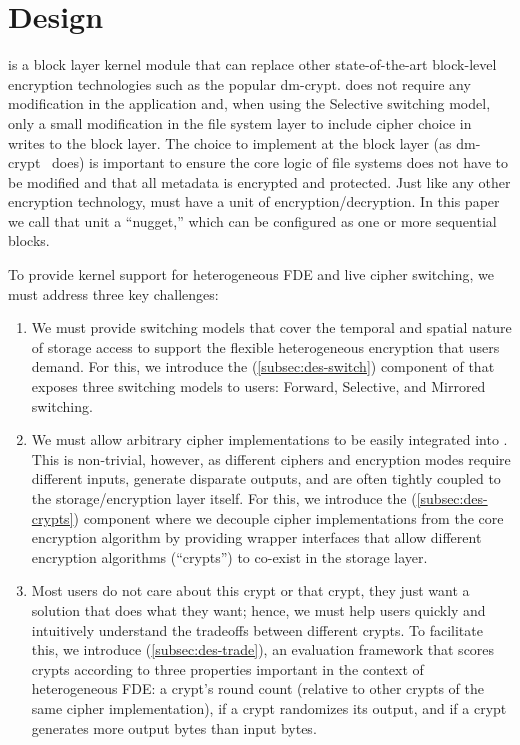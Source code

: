 \section{\sys Design}\label{sec:des}

\sys is a block layer kernel module that can replace other state-of-the-art
block-level encryption technologies such as the popular dm-crypt. \sys does not
require any modification in the application and, when using the Selective
switching model, only a small modification in the file system layer to include
cipher choice in writes to the block layer. The choice to implement \sys at the
block layer (as dm-crypt~\cite{dmcrypt} does) is important to ensure the core
logic of file systems does not have to be modified and that all metadata is
encrypted and protected. Just like any other encryption technology, \sys must
have a unit of encryption/decryption. In this paper we call that unit a
``nugget,'' which can be configured as one or more sequential blocks.

To provide kernel support for heterogeneous FDE and live cipher switching, we
must address three key challenges:

\begin{enumerate}

\item We must provide switching models that cover the temporal and spatial
  nature of storage access to support the flexible heterogeneous encryption that
  users demand. For this, we introduce the \sysA (\cref{subsec:des-switch})
  component of \sys that exposes three switching models to users: Forward,
  Selective, and Mirrored switching.

\item We must allow arbitrary cipher implementations to be easily integrated
  into \sys. This is non-trivial, however, as different ciphers and encryption
  modes require different inputs, generate disparate outputs, and are often
  tightly coupled to the storage/encryption layer itself. For this, we introduce
  the \sysB (\cref{subsec:des-crypts}) component where we decouple cipher
  implementations from the core encryption algorithm by providing wrapper
  interfaces that allow different encryption algorithms (``crypts'') to co-exist
  in the storage layer.

\item Most users do not care about this crypt or that crypt, they just want a
  solution that does what they want; hence, we must help users quickly and
  intuitively understand the tradeoffs between different crypts. To facilitate
  this, we introduce \sysC (\cref{subsec:des-trade}), an evaluation framework
  that scores crypts according to three properties important in the context of
  heterogeneous FDE: a crypt's round count (relative to other crypts of the same
  cipher implementation), if a crypt randomizes its output, and if a crypt
  generates more output bytes than input bytes.

\end{enumerate}

